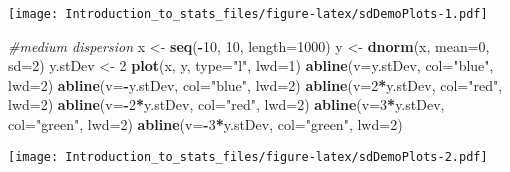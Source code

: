 \documentclass[
]{article}
\newenvironment{Shaded}{\begin{snugshade}}{\end{snugshade}}
\newcommand{\CommentTok}[1]{\textcolor[rgb]{0.56,0.35,0.01}{\textit{#1}}}
\newcommand{\DataTypeTok}[1]{\textcolor[rgb]{0.13,0.29,0.53}{#1}}
\newcommand{\DecValTok}[1]{\textcolor[rgb]{0.00,0.00,0.81}{#1}}
\newcommand{\KeywordTok}[1]{\textcolor[rgb]{0.13,0.29,0.53}{\textbf{#1}}}
\newcommand{\NormalTok}[1]{#1}
\newcommand{\OperatorTok}[1]{\textcolor[rgb]{0.81,0.36,0.00}{\textbf{#1}}}
\newcommand{\StringTok}[1]{\textcolor[rgb]{0.31,0.60,0.02}{#1}}
\begin{document}
\texttt{[image: Introduction\_to\_stats\_files/figure-latex/sdDemoPlots-1.pdf]}

\begin{Shaded}
\begin{Highlighting}[]
\CommentTok{\#medium dispersion}
\NormalTok{x \textless{}{-}}\StringTok{ }\KeywordTok{seq}\NormalTok{(}\OperatorTok{{-}}\DecValTok{10}\NormalTok{, }\DecValTok{10}\NormalTok{, }\DataTypeTok{length=}\DecValTok{1000}\NormalTok{)}
\NormalTok{y \textless{}{-}}\StringTok{ }\KeywordTok{dnorm}\NormalTok{(x, }\DataTypeTok{mean=}\DecValTok{0}\NormalTok{, }\DataTypeTok{sd=}\DecValTok{2}\NormalTok{)}
\NormalTok{y.stDev \textless{}{-}}\StringTok{ }\DecValTok{2}
\KeywordTok{plot}\NormalTok{(x, y, }\DataTypeTok{type=}\StringTok{"l"}\NormalTok{, }\DataTypeTok{lwd=}\DecValTok{1}\NormalTok{)}
\KeywordTok{abline}\NormalTok{(}\DataTypeTok{v=}\NormalTok{y.stDev, }\DataTypeTok{col=}\StringTok{"blue"}\NormalTok{, }\DataTypeTok{lwd=}\DecValTok{2}\NormalTok{)}
\KeywordTok{abline}\NormalTok{(}\DataTypeTok{v=}\OperatorTok{{-}}\NormalTok{y.stDev, }\DataTypeTok{col=}\StringTok{"blue"}\NormalTok{, }\DataTypeTok{lwd=}\DecValTok{2}\NormalTok{)}
\KeywordTok{abline}\NormalTok{(}\DataTypeTok{v=}\DecValTok{2}\OperatorTok{*}\NormalTok{y.stDev, }\DataTypeTok{col=}\StringTok{"red"}\NormalTok{, }\DataTypeTok{lwd=}\DecValTok{2}\NormalTok{)}
\KeywordTok{abline}\NormalTok{(}\DataTypeTok{v=}\OperatorTok{{-}}\DecValTok{2}\OperatorTok{*}\NormalTok{y.stDev, }\DataTypeTok{col=}\StringTok{"red"}\NormalTok{, }\DataTypeTok{lwd=}\DecValTok{2}\NormalTok{)}
\KeywordTok{abline}\NormalTok{(}\DataTypeTok{v=}\DecValTok{3}\OperatorTok{*}\NormalTok{y.stDev, }\DataTypeTok{col=}\StringTok{"green"}\NormalTok{, }\DataTypeTok{lwd=}\DecValTok{2}\NormalTok{)}
\KeywordTok{abline}\NormalTok{(}\DataTypeTok{v=}\OperatorTok{{-}}\DecValTok{3}\OperatorTok{*}\NormalTok{y.stDev, }\DataTypeTok{col=}\StringTok{"green"}\NormalTok{, }\DataTypeTok{lwd=}\DecValTok{2}\NormalTok{)}
\end{Highlighting}
\end{Shaded}

\texttt{[image: Introduction\_to\_stats\_files/figure-latex/sdDemoPlots-2.pdf]}
\end{document}
